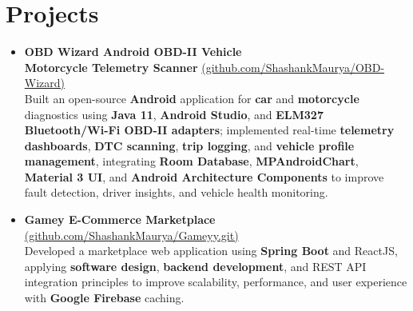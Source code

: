 \documentclass[a4paper,10pt]{article}
\begin{document}
\section{Projects}
\begin{itemize}[leftmargin=*, itemsep=0pt]
    \item \textbf{OBD Wizard  Android OBD-II Vehicle \\ Motorcycle Telemetry Scanner} \hfill \href{https://github.com/ShashankMaurya/OBD-Wizard}{(github.com/ShashankMaurya/OBD-Wizard)}                                                                                  \\
          Built an open-source \textbf{Android} application for \textbf{car} and \textbf{motorcycle} diagnostics using \textbf{Java 11}, \textbf{Android Studio}, and \textbf{ELM327 Bluetooth/Wi-Fi OBD-II adapters}; implemented real-time \textbf{telemetry dashboards}, \textbf{DTC scanning}, \textbf{trip logging}, and \textbf{vehicle profile management}, integrating \textbf{Room Database}, \textbf{MPAndroidChart}, \textbf{Material 3 UI}, and \textbf{Android Architecture Components} to improve fault detection, driver insights, and vehicle health monitoring.

    \item \textbf{Gamey  E-Commerce Marketplace} \hfill \href{https://github.com/ShashankMaurya/Gameyy.git}{(github.com/ShashankMaurya/Gameyy.git)}                                                                                                         \\
          Developed a marketplace web application using \textbf{Spring Boot} and ReactJS, applying \textbf{software design}, \textbf{backend development}, and REST API integration principles to improve scalability, performance, and user experience with \textbf{Google Firebase} caching.

\end{itemize}
\end{document}
